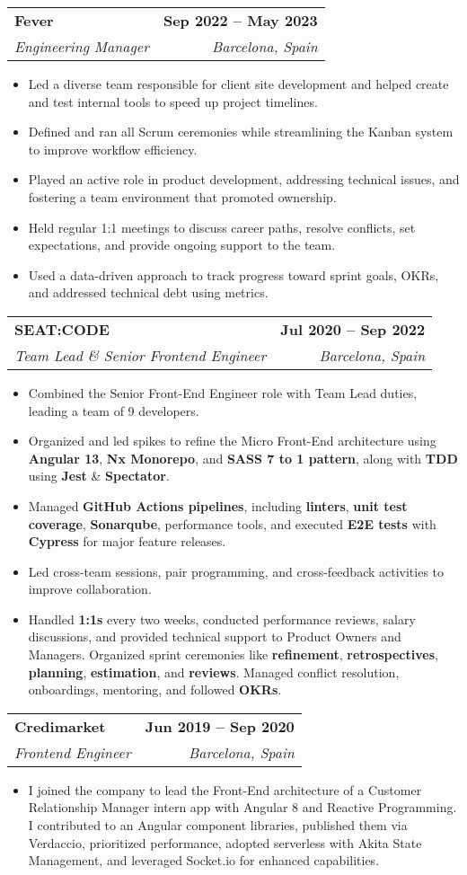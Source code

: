 \documentclass[letterpaper,11pt]{article}
\makeatletter
\newcommand{\resumeItem}[1]{
  \item\small{
    {#1 \vspace{-2pt}}
  }
}
\newcommand{\resumeSubheading}[4]{
  \vspace{-2pt}\item
    \begin{tabular*}{1.0\textwidth}[t]{l@{\extracolsep{\fill}}r}
      \textbf{#1} & \textbf{\small #2} \\
      \textit{\small#3} & \textit{\small #4} \\
    \end{tabular*}\vspace{-7pt}
}
\newcommand{\resumeItemListStart}{\begin{itemize}}
\newcommand{\resumeItemListEnd}{\end{itemize}\vspace{-5pt}}
\makeatother
\begin{document}
    \resumeSubheading
      {Fever}{Sep 2022 -- May 2023}
      {Engineering Manager}{Barcelona, Spain}
      \resumeItemListStart
        \resumeItem{Led a diverse team responsible for client site development and helped create and test internal tools to speed up project timelines.}
        \resumeItem{Defined and ran all Scrum ceremonies while streamlining the Kanban system to improve workflow efficiency.}
        \resumeItem{Played an active role in product development, addressing technical issues, and fostering a team environment that promoted ownership.}
        \resumeItem{Held regular 1:1 meetings to discuss career paths, resolve conflicts, set expectations, and provide ongoing support to the team.}
        \resumeItem{Used a data-driven approach to track progress toward sprint goals, OKRs, and addressed technical debt using metrics.}
    \resumeItemListEnd
    \vspace{8pt}


    \resumeSubheading
      {SEAT:CODE}{Jul 2020 -- Sep 2022}
      {Team Lead \& Senior Frontend Engineer}{Barcelona, Spain}
      \resumeItemListStart
        \resumeItem{Combined the Senior Front-End Engineer role with Team Lead duties, leading a team of 9 developers.}
        \resumeItem{Organized and led spikes to refine the Micro Front-End architecture using \textbf{Angular 13}, \textbf{Nx Monorepo}, and \textbf{SASS 7 to 1 pattern}, along with \textbf{TDD} using \textbf{Jest} \& \textbf{Spectator}.}
        \resumeItem{Managed \textbf{GitHub Actions pipelines}, including \textbf{linters}, \textbf{unit test coverage}, \textbf{Sonarqube}, performance tools, and executed \textbf{E2E tests} with \textbf{Cypress} for major feature releases.}
        \resumeItem{Led cross-team sessions, pair programming, and cross-feedback activities to improve collaboration.}
        \resumeItem{Handled \textbf{1:1s} every two weeks, conducted performance reviews, salary discussions, and provided technical support to Product Owners and Managers. Organized sprint ceremonies like \textbf{refinement}, \textbf{retrospectives}, \textbf{planning}, \textbf{estimation}, and \textbf{reviews}. Managed conflict resolution, onboardings, mentoring, and followed \textbf{OKRs}.}
    \resumeItemListEnd
    \vspace{8pt}

    \resumeSubheading
      {Credimarket}{Jun 2019 -- Sep 2020}
      {Frontend Engineer}{Barcelona, Spain}
      \resumeItemListStart
        \resumeItem{I joined the company to lead the Front-End architecture of a Customer Relationship Manager intern app with Angular 8 and Reactive Programming. I contributed to an Angular component libraries, published them via Verdaccio, prioritized performance, adopted serverless with Akita State Management, and leveraged Socket.io for enhanced capabilities.}
    \resumeItemListEnd    
    
\end{document}

